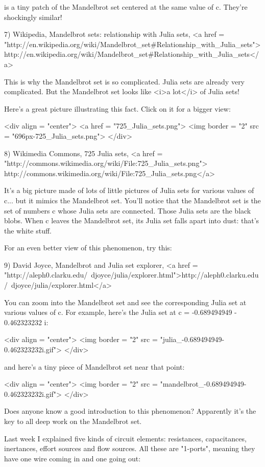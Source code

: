 is a tiny patch of the Mandelbrot set centered at the
same value of c.  They're shockingly similar!

7) Wikipedia, Mandelbrot sets: relationship with Julia sets,
<a href = "http://en.wikipedia.org/wiki/Mandelbrot_set#Relationship_with_Julia_sets">http://en.wikipedia.org/wiki/Mandelbrot_set#Relationship_with_Julia_sets</a>

This is why the Mandelbrot set is so complicated.  Julia sets are
already very complicated.  But the Mandelbrot set looks like <i>a
lot</i> of Julia sets!

Here's a great picture illustrating this fact.  Click on it for a bigger
view:

<div align = "center">
<a href = "725_Julia_sets.png">
<img border = "2" src = "696px-725_Julia_sets.png">
</div>

8) Wikimedia Commons, 725 Julia sets,
<a href = "http://commons.wikimedia.org/wiki/File:725_Julia_sets.png">
http://commons.wikimedia.org/wiki/File:725_Julia_sets.png</a>

It's a big picture made of lots of little pictures of Julia sets for
various values of c...  but it mimics the Mandelbrot set.  You'll
notice that the Mandelbrot set is the set of numbers c whose Julia
sets are connected.  Those Julia sets are the black blobs.  When c
leaves the Mandelbrot set, its Julia set falls apart into dust: that's
the white stuff.

For an even better view of this phenomenon, try this:

9) David Joyce, Mandelbrot and Julia set explorer, 
<a href = "http://aleph0.clarku.edu/~djoyce/julia/explorer.html">http://aleph0.clarku.edu/~djoyce/julia/explorer.html</a>

You can zoom into the Mandelbrot set and see the corresponding Julia
set at various values of c.  For example, here's the Julia set at
c = -0.689494949 - 0.462323232 i:

<div align = "center">
<img border = "2" src = "julia_-0.689494949-0.462323232i.gif">
</div>

and here's a tiny piece of Mandelbrot set near that point:

<div align = "center">
<img border = "2" src = "mandelbrot_-0.689494949-0.462323232i.gif">
</div>

Does anyone know a good introduction to this phenomenon?  Apparently
it's the key to all deep work on the Mandelbrot set.

Last week I explained five kinds of circuit elements: resistances,
capacitances, inertances, effort sources and flow sources.  All these
are "1-ports", meaning they have one wire coming in and one
going out:


